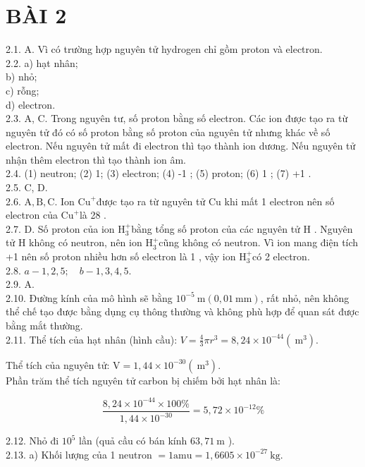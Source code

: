 \documentclass[10pt]{article}
\begin{document}
\section*{BÀI 2}
2.1. A. Vì có trường hợp nguyên tử hydrogen chỉ gồm proton và electron.\\
2.2. a) hạt nhân;\\
b) nhỏ;\\
c) rỗng;\\
d) electron.\\
2.3. A, C. Trong nguyên tư, số proton bằng số electron. Các ion được tạo ra từ nguyên tử đó có số proton bằng số proton của nguyên tử nhưng khác về số electron. Nếu nguyên tử mất đi electron thì tạo thành ion dương. Nếu nguyên tử nhận thêm electron thì tạo thành ion âm.\\
2.4. (1) neutron; (2) 1; (3) electron; (4) -1 ; (5) proton; (6) 1 ; (7) +1 .\\
2.5. C, D.\\
2.6. $\mathrm{A}, \mathrm{B}, \mathrm{C}$. Ion $\mathrm{Cu}^{+}$được tạo ra từ nguyên tử Cu khi mất 1 electron nên số electron của $\mathrm{Cu}^{+}$là 28 .\\
2.7. D. Số proton của ion $\mathrm{H}_{3}^{+}$bằng tổng số proton của các nguyên tử H . Nguyên tử H không có neutron, nên ion $\mathrm{H}_{3}^{+}$cũng không có neutron. Vì ion mang điện tích +1 nên số proton nhiều hơn số electron là 1 , vậy ion $\mathrm{H}_{3}^{+}$có 2 electron.\\
2.8. $a-1,2,5 ; \quad b-1,3,4,5$.\\
2.9. A.\\
2.10. Đường kính của mô hình sẽ bằng $10^{-5} \mathrm{~m}(0,01 \mathrm{~mm})$, rất nhỏ, nên không thể chế tạo được bằng dụng cụ thông thường và không phù hợp để quan sát được bằng mắt thường.\\
2.11. Thể tích của hạt nhân (hình cầu): $V=\frac{4}{3} \pi r^{3}=8,24 \times 10^{-44}\left(\mathrm{~m}^{3}\right)$.

Thể tích của nguyên tử: $\mathrm{V}=1,44 \times 10^{-30}\left(\mathrm{~m}^{3}\right)$.\\
Phần trăm thể tích nguyên tử carbon bị chiếm bởi hạt nhân là:

$$
\frac{8,24 \times 10^{-44} \times 100 \%}{1,44 \times 10^{-30}}=5,72 \times 10^{-12} \%
$$

2.12. Nhỏ đi $10^{5}$ lần (quả cầu có bán kính $63,71 \mathrm{~m}$ ).\\
2.13. a) Khối lượng của 1 neutron $=1 \mathrm{amu}=1,6605 \times 10^{-27} \mathrm{~kg}$.
\end{document}
